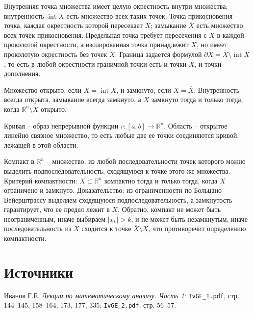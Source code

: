 \documentclass[12pt,a4paper]{article}
\newcommand{\R}{\mathbb{R}}
\begin{document}
Внутренняя точка множества имеет целую окрестность внутри множества;
внутренность \(\operatorname{int}X\) есть множество всех таких точек. Точка
прикосновения -- точка, каждая окрестность которой пересекает \(X\);
замыкание \(\overline X\) есть множество всех точек прикосновения.
Предельная точка требует пересечения с \(X\) в каждой проколотой
окрестности, а изолированная точка принадлежит \(X\), но имеет проколотую
окрестность без точек \(X\). Граница задается формулой
\(\partial X=\overline X\setminus\operatorname{int}X\), то есть в любой
окрестности граничной точки есть и точки \(X\), и точки дополнения.

Множество открыто, если \(X=\operatorname{int}X\), и замкнуто, если
\(X=\overline X\). Внутренность всегда открыта, замыкание всегда замкнуто,
а \(X\) замкнуто тогда и только тогда, когда \(\R^n\setminus X\) открыто.

Кривая -- образ непрерывной функции \(r:[a,b]\to\R^n\). Область -- открытое
линейно связное множество, то есть любые две ее точки соединяются кривой,
лежащей в этой области.

Компакт в \(\R^n\) -- множество, из любой последовательности точек которого
можно выделить подпоследовательность, сходящуюся к точке этого же множества.
Критерий компактности: \(X\subset\R^n\) компактно тогда и только тогда,
когда \(X\) ограничено и замкнуто. Доказательство: из ограниченности по
Больцано--Вейерштрассу выделяем сходящуюся подпоследовательность, а
замкнутость гарантирует, что ее предел лежит в \(X\). Обратно, компакт не
может быть неограниченным, иначе выбираем \(|x_k|>k\), и не может быть
незамкнутым, иначе последовательность из \(X\) сходится к точке
\(\overline X\setminus X\), что противоречит определению компактности.

\section*{Источники}

Иванов Г.Е. \emph{Лекции по математическому анализу. Часть 1}:
\texttt{IvGE\_1.pdf}, стр. 144--145, 158--164, 173, 177, 335;
\texttt{IvGE\_2.pdf}, стр. 56--57.
\end{document}
